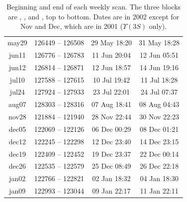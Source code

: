 \documentclass[aps,prd,preprint,superscriptaddress,tightenlines,nofootinbib,floatfix]{revtex4}
\begin{document}
\begin{table}[t]
\begin{center}
\begin{tabular}{c | c | c c}
may29 & 126449 -- 126508 & 29 May 18:20 & 31 May 18:28 \\ %
jun11 & 126776 -- 126783 & 11 Jun 20:04 & 12 Jun 05:51 \\ %
jun12 & 126814 -- 126871 & 12 Jun 18:57 & 14 Jun 19:16 \\ %
jul10 & 127588 -- 127615 & 10 Jul 19:42 & 11 Jul 18:28 \\ %
jul24 & 127924 -- 127933 & 23 Jul 22:01 & 24 Jul 07:37 \\ %
aug07 & 128303 -- 128316 & 07 Aug 18:41 & 08 Aug 04:43 \\\hline %
nov28 & 121884 -- 121940 & 28 Nov 22:44 & 30 Nov 22:23 \\ %
dec05 & 122069 -- 122126 & 06 Dec 00:29 & 08 Dec 01:21 \\ %
dec12 & 122245 -- 122298 & 12 Dec 23:40 & 14 Dec 23:15 \\ %
dec19 & 122409 -- 122452 & 19 Dec 23:37 & 22 Dec 00:14 \\ %
dec26 & 122535 -- 122579 & 25 Dec 08:49 & 26 Dec 22:18 \\ %
jan02 & 122766 -- 122821 & 02 Jan 18:32 & 04 Jan 18:30 \\ %
jan09 & 122993 -- 123044 & 09 Jan 22:17 & 11 Jan 22:11 \\\hline %
    \end{tabular}
  \end{center}
  \caption{\label{scandates} Beginning and end of each weekly scan.
  The three blocks are \uone, \utwo, and \uthree, top to bottom.
  Dates are in 2002 except for Nov and Dec, which are in 2001
  ($\Upsilon(3S)$ only).}
\end{table}

\pagebreak
\mbox{ }
\end{document}
